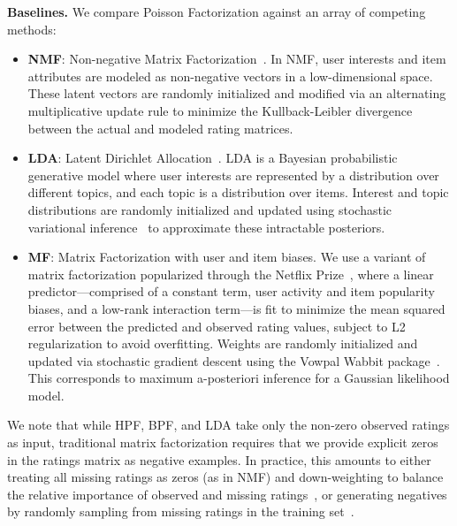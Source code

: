{\bf Baselines.} We compare Poisson Factorization against an array of
competing methods:
\begin{itemize}
  \item {\bf NMF}: Non-negative Matrix
    Factorization~\cite{Lee:1999}. In NMF, user interests and item
    attributes are modeled as non-negative vectors in a
    low-dimensional space. These latent vectors are randomly
    initialized and modified via an alternating multiplicative update
    rule to minimize the Kullback-Leibler divergence between the
    actual and modeled rating matrices.

  \item {\bf LDA}: Latent Dirichlet Allocation~\cite{Blei:2003b}. LDA
    is a Bayesian probabilistic generative model where user interests
    are represented by a distribution over different topics, and each
    topic is a distribution over items. Interest and topic
    distributions are randomly initialized and updated using
    stochastic variational inference~\cite{Hoffman:2010a} to
    approximate these intractable posteriors.

  \item {\bf MF}: Matrix Factorization with user and item biases. We
    use a variant of matrix factorization popularized through the
    Netflix Prize~\cite{Koren:2009}, where a linear
    predictor---comprised of a constant term, user activity and item
    popularity biases, and a low-rank interaction term---is fit to
    minimize the mean squared error between the predicted and observed
    rating values, subject to L2 regularization to avoid
    overfitting. Weights are randomly initialized and updated via
    stochastic gradient descent using the Vowpal Wabbit
    package~\cite{Weinberger:2009}. This corresponds to maximum
    a-posteriori inference for a Gaussian likelihood model.

\end{itemize}

We note that while HPF, BPF, and LDA take only the non-zero observed
ratings as input, traditional matrix factorization requires that we
provide explicit zeros in the ratings matrix as negative examples. In
practice, this amounts to either treating all missing ratings as zeros
(as in NMF) and down-weighting to balance the relative importance of
observed and missing ratings~\cite{Hu:2008p9402}, or generating
negatives by randomly sampling from missing ratings in the training
set~\cite{Dror:2012a}.

